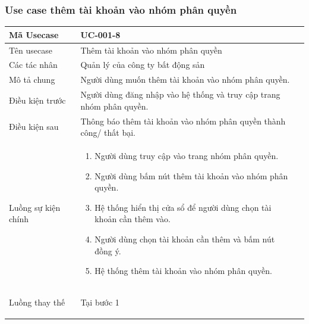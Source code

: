 \documentclass[12pt,a4paper]{article}
\begin{document}
    \subsubsection*{Use case thêm tài khoản vào nhóm phân quyền }

    \begin{table}[H]
        \centering
        \begin{tabular}{|p{3.5cm}|p{11.5cm}|c|}
            \hline
            Mã Usecase      & UC-001-8                                                             \\
            \hline
            Tên usecase     & Thêm tài khoản vào nhóm phân quyền                                   \\
            \hline
            Các tác nhân    & Quản lý của công ty bất động sản                                     \\
            \hline
            Mô tả chung     & Người dùng muốn thêm tài khoản vào nhóm phân quyền.                  \\
            \hline
            Điều kiện trước & Người dùng đăng nhập vào hệ thống và truy cập trang nhóm phân quyền. \\
            \hline
            Điều kiện sau   & Thông báo thêm tài khoản vào nhóm phân quyền thành công/ thất bại.   \\
            \hline
            Luồng sự kiện chính & \vspace{-.8cm}\begin{enumerate}
                                                    \item Người dùng truy cập vào trang nhóm phân quyền.
                                                    \item Người dùng bấm nút thêm tài khoản vào nhóm phân quyền.
                                                    \item Hệ thống hiển thị cửa sổ để người dùng chọn tài khoản cần thêm vào.
                                                    \item Người dùng chọn tài khoản cần thêm và bấm nút đồng ý.
                                                    \item Hệ thống thêm tài khoản vào nhóm phân quyền.
            \end{enumerate}
            \\
            \hline
            Luồng thay thế & Tại bước 1\newline
            \vspace{-.8cm}\begin{itemize}

\end{itemize}
\end{tabular}
\end{table}
\end{document}

